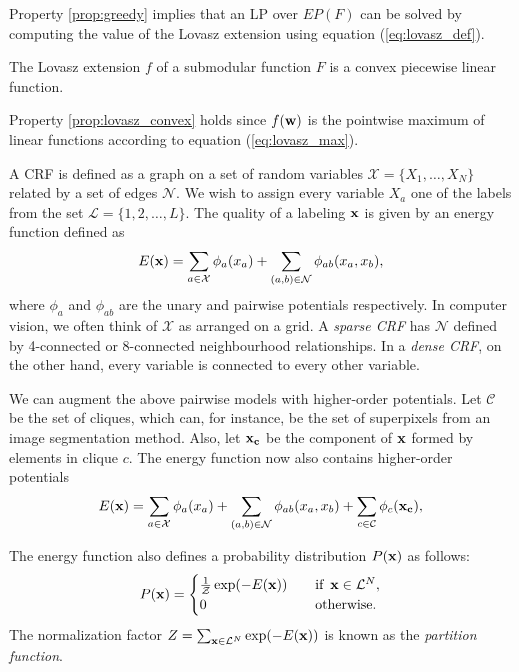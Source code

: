 Property \ref{prop:greedy} implies that an LP over $EP(F)$ can be solved by computing the value of the Lovasz extension using equation (\ref{eq:lovasz_def}).

{\prop The Lovasz extension $f$ of a submodular function $F$ is a convex piecewise linear function.\label{prop:lovasz_convex}}

Property \ref{prop:lovasz_convex} holds since $f({\bf w})$ is the pointwise maximum of linear functions according to equation (\ref{eq:lovasz_max}).

A CRF is defined as a graph on a set of random variables ${\mathcal X} = \{X_1,\dots, X_N\}$ related by a set of edges $\mathcal N$. We wish to assign every variable $X_a$ one of the labels from the set $\mathcal{L} = \{1, 2, \dots, L\}$. The quality of a labeling $\bf x$ is given by an energy function defined as 
%
\begin{equation}
    E({\bf x}) = \sum_{a \in {\mathcal X}} \phi_a(x_a) + \sum_{(a, b) \in {\mathcal N}} \phi_{ab}(x_a, x_b),
    \label{eq:energy_min}
  \end{equation}
%
where $\phi_a$ and $\phi_{ab}$ are the unary and pairwise potentials respectively. In computer vision, we often think of $\mathcal X$ as arranged on a grid. A \emph{sparse CRF} has $\mathcal N$ defined by 4-connected or 8-connected neighbourhood relationships. In a \emph{dense CRF}, on the other hand, every variable is connected to every other variable.

We can augment the above pairwise models with higher-order potentials. Let $\mathcal C$ be the set of cliques, which can, for instance, be the set of superpixels from an image segmentation method. Also, let $\bf x_c$ be the component of $\bf x$ formed by elements in clique $c$. The energy function now also contains higher-order potentials 
%
\begin{equation}
    E({\bf x}) = \sum_{a \in {\mathcal X}} \phi_a(x_a) + \sum_{(a, b) \in {\mathcal N}} \phi_{ab}(x_a, x_b) + \sum_{c \in {\mathcal C}} \phi_c({\bf x_c}),
    \label{eq:energy_hop_min}
  \end{equation}
%
 
The energy function also defines a probability distribution $P({\bf x})$ as follows:
\begin{equation}
    P({\bf x}) =
    \begin{cases}
        \frac{1}{\mathcal{Z}} \exp(-E({\bf x})) & \quad \text{if} \enskip {\bf x} \in {\mathcal L}^N,\\
       0  & \quad \text{otherwise}. \\
    \end{cases}
\label{eq:crf_prob_distrib}
\end{equation}
The normalization factor $Z = \sum_{{\bf x} \in {\mathcal L}^N} \exp(-E({\bf x}))$ is known as the {\it partition function}. 

